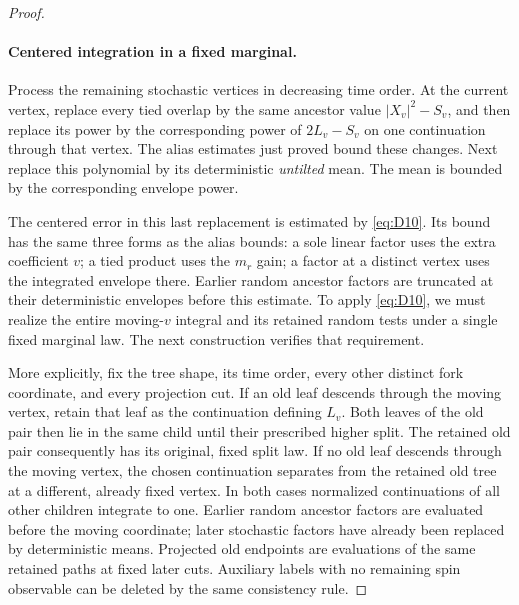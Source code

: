 \begin{proof}
\paragraph{Centered integration in a fixed marginal.}
Process the remaining stochastic vertices in decreasing time
order.  At the current vertex, replace every tied overlap by the same
ancestor value $|X_v|^2-S_v$, and then replace its power by the
corresponding power of $2L_v-S_v$ on one continuation through that
vertex.  The alias estimates just proved bound these changes.  Next
replace this polynomial by its deterministic \emph{untilted} mean.
The mean is bounded by the corresponding envelope power.

The centered error in this last replacement is estimated by
\eqref{eq:D10}.  Its bound has the same three forms as the alias
bounds: a sole linear factor uses the extra coefficient $v$; a tied
product uses the $m_r$ gain; a factor at a distinct vertex uses the
integrated envelope there.  Earlier random ancestor factors are
truncated at their deterministic envelopes before this estimate.
To apply \eqref{eq:D10}, we must realize the entire moving-$v$
integral and its retained random tests under a single fixed marginal
law.  The next construction verifies that requirement.

More explicitly, fix the tree shape, its time order, every other distinct
fork coordinate, and every projection cut.  If an old leaf descends
through the moving vertex, retain that leaf as the continuation defining
$L_v$.  Both leaves of the old pair then lie in the same child until
their prescribed higher split.  The retained old pair consequently has
its original, fixed split law.  If no old leaf descends through the
moving vertex, the chosen continuation separates from the retained old
tree at a different, already fixed vertex.  In both cases normalized
continuations of all other children integrate to one.  Earlier random
ancestor factors are evaluated before the moving coordinate; later
stochastic factors have already been replaced by deterministic means.
Projected old endpoints are evaluations of the same retained paths at
fixed later cuts.  Auxiliary labels with no remaining spin observable
can be deleted by the same consistency rule.


\end{proof}

